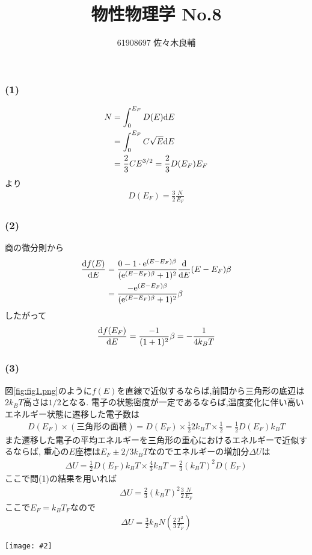 \documentclass[uplatex,a4j,11pt,dvipdfmx]{jsarticle}
\makeatletter
\def\fgcaption{\def\@captype{figure}\caption}
\newcommand{\mfig}[3][width=15cm]{
\begin{center}
\texttt{[image: \#2]}
\fgcaption{#3 \label{fig:#2}}
\end{center}
}
\makeatother
\begin{document}
\title{物性物理学 No.8}
\author{61908697 佐々木良輔}
\date{}
\maketitle
\subsubsection*{(1)}
\begin{align}
  \begin{split}
    N&=\int_0^{E_F}D(E){\rm d}E\\
    &=\int_0^{E_F}C\sqrt{E}{\rm d}E\\
    &=\frac{2}{3}CE^{3/2}=\frac{2}{3}D(E_F)E_F
  \end{split}
\end{align}
より
\begin{align}
  D(E_F)=\frac{3}{2}\frac{N}{E_F}
\end{align}
\subsubsection*{(2)}
商の微分則から
\begin{align}
  \begin{split}
    \frac{{\rm d}f(E)}{{\rm d}E}&=\frac{0-1\cdot{\rm e}^{(E-E_F)\beta}}{({\rm e}^{(E-E_F)\beta}+1)^2}\frac{{\rm d}}{{\rm d}E}(E-E_F)\beta\\
    &=\frac{-{\rm e}^{(E-E_F)\beta}}{({\rm e}^{(E-E_F)\beta}+1)^2}\beta
  \end{split}
\end{align}
したがって
\begin{align}
  \frac{{\rm d}f(E_F)}{{\rm d}E}=\frac{-1}{(1+1)^2}\beta=-\frac{1}{4k_BT}
\end{align}
\subsubsection*{(3)}
図\ref{fig:fig1.png}のように$f(E)$を直線で近似するならば,前問から三角形の底辺は$2k_BT$高さは$1/2$となる.
電子の状態密度が一定であるならば,温度変化に伴い高いエネルギー状態に遷移した電子数は
\begin{align}
  D(E_F)\times(三角形の面積)=D(E_F)\times\frac{1}{2}2k_BT\times\frac{1}{2}=\frac{1}{2}D(E_F)k_BT
\end{align}
また遷移した電子の平均エネルギーを三角形の重心におけるエネルギーで近似するならば,
重心の$E$座標は$E_F\pm2/3k_BT$なのでエネルギーの増加分$\Delta U$は
\begin{align}
  \Delta U=\frac{1}{2}D(E_F)k_BT\times\frac{4}{3}k_BT=\frac{2}{3}(k_BT)^2D(E_F)
\end{align}
ここで問(1)の結果を用いれば
\begin{align}
  \Delta U=\frac{2}{3}(k_BT)^2\frac{3}{2}\frac{N}{E_F}
\end{align}
ここで$E_F=k_BT_F$なので
\begin{align}
  \Delta U=\frac{3}{2}k_BN\left(\frac{2}{3}\frac{T^2}{T_F}\right)
\end{align}
\mfig[width=8cm]{fig1.png}{直線による近似}
\end{document}
